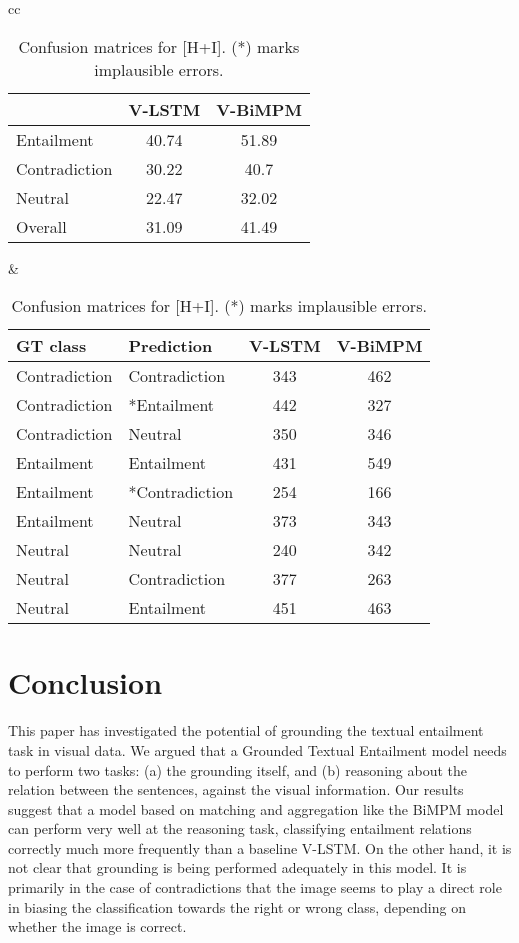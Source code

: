 \documentclass[11pt]{article}
\begin{document}
\begin{table}
\small
\begin{center}
\begin{tabular}{cc}
\begin{tabular}{|l|cc|}\hline
 & V-LSTM & V-BiMPM  \\ \hline
Entailment & 40.74& 51.89    \\ 
Contradiction & 30.22 & 40.7 \\
Neutral  & 22.47 & 32.02 \\\hline
Overall & 31.09 & 41.49 \\\hline
\end{tabular}

&

\begin{tabular}{|ll|cc|}\hline
GT class & Prediction & V-LSTM & V-BiMPM \\\hline
Contradiction & Contradiction & 343 & 462 \\
Contradiction & *Entailment &  442 & 327 \\
Contradiction & Neutral & 350 & 346  \\\hline
Entailment & Entailment & 431 & 549 \\
Entailment & *Contradiction & 254 & 166 \\
Entailment & Neutral & 373 & 343 \\\hline
Neutral & Neutral & 240 & 342 \\
Neutral & Contradiction &  377& 263 \\
Neutral & Entailment & 451 & 463 \\\hline
\end{tabular}
\end{tabular}
\caption{Confusion matrices for [H+I]. (*) marks implausible errors.}\label{tab:groundhyp}
\end{center}
\end{table}

 \section{Conclusion}
\label{sec:conclusion}
This paper has investigated the potential of grounding the textual entailment task in visual data. We argued that a Grounded Textual Entailment model needs to perform two tasks: (a) the grounding itself, and (b) reasoning about the relation between the sentences, against the visual information. Our results suggest that a model based on matching and aggregation like the BiMPM model~\cite{Wang2017} can perform very well at the reasoning task, classifying entailment relations correctly much more frequently than a baseline V-LSTM. On the other hand, it is not clear that grounding is being performed adequately in this model.
It is primarily in the case of contradictions that the image seems to play a direct role in biasing the classification towards the right or wrong class, depending on whether the image is correct. 
\end{document}
